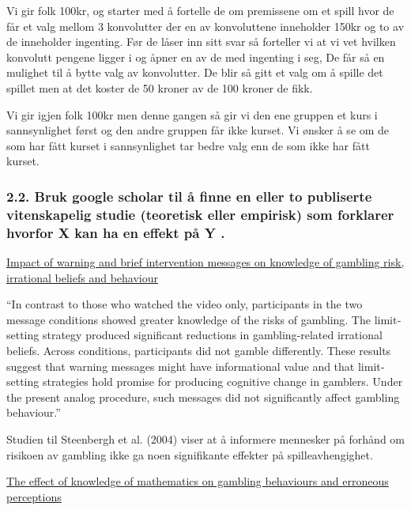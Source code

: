 \documentclass[
  12pt,
  a4paper,
  DIV=11,
  numbers=noendperiod]{scrartcl}
\begin{document}
Vi gir folk 100kr, og starter med å fortelle de om premissene om et
spill hvor de får et valg mellom 3 konvolutter der en av konvoluttene
inneholder 150kr og to av de inneholder ingenting. Før de låser inn sitt
svar så forteller vi at vi vet hvilken konvolutt pengene ligger i og
åpner en av de med ingenting i seg, De får så en mulighet til å bytte
valg av konvolutter. De blir så gitt et valg om å spille det spillet men
at det koster de 50 kroner av de 100 kroner de fikk.

Vi gir igjen folk 100kr men denne gangen så gir vi den ene gruppen et
kurs i sannsynlighet først og den andre gruppen får ikke kurset. Vi
ønsker å se om de som har fått kurset i sannsynlighet tar bedre valg enn
de som ikke har fått kurset.

\clearpage

\subsubsection{2.2. Bruk google scholar til å finne en eller to
publiserte vitenskapelig studie (teoretisk eller empirisk) som forklarer
hvorfor X kan ha en effekt på Y
.}\label{bruk-google-scholar-til-uxe5-finne-en-eller-to-publiserte-vitenskapelig-studie-teoretisk-eller-empirisk-som-forklarer-hvorfor-x-kan-ha-en-effekt-puxe5-y-.}

\href{https://www.tandfonline.com/doi/full/10.1080/1445979042000224377}{Impact
of warning and brief intervention messages on knowledge of gambling
risk, irrational beliefs and behaviour}

``In contrast to those who watched the video only, participants in the
two message conditions showed greater knowledge of the risks of
gambling. The limit‐setting strategy produced significant reductions in
gambling‐related irrational beliefs. Across conditions, participants did
not gamble differently. These results suggest that warning messages
might have informational value and that limit‐setting strategies hold
promise for producing cognitive change in gamblers. Under the present
analog procedure, such messages did not significantly affect gambling
behaviour.''

Studien til Steenbergh et al. (2004) viser at å informere mennesker på
forhånd om risikoen av gambling ikke ga noen signifikante effekter på
spilleavhengighet.

\href{https://www.tandfonline.com/doi/abs/10.1080/00207590600788047}{The
effect of knowledge of mathematics on gambling behaviours and erroneous
perceptions}
\end{document}
